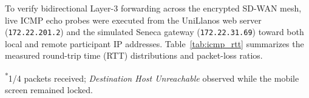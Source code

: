 To verify bidirectional Layer-3 forwarding across the encrypted SD-WAN mesh, live ICMP echo probes were executed from the UniLlanos web server (\texttt{172.22.201.2}) and the simulated Seneca gateway (\texttt{172.22.31.69}) toward both local and remote participant IP addresses. Table~\ref{tab:icmp_rtt} summarizes the measured round-trip time (RTT) distributions and packet-loss ratios.

\begin{table}[t]
\centering
\caption{Live ICMP Round-Trip Time (RTT) and Packet Loss Verification Across the ZeroTier SD-WAN.}
\label{tab:icmp_rtt}
\vspace{3pt}
\par\noindent\parbox{\columnwidth}{\footnotesize\textsuperscript{*}1/4 packets received; \textit{Destination Host Unreachable} observed while the mobile screen remained locked.}
\end{table}

